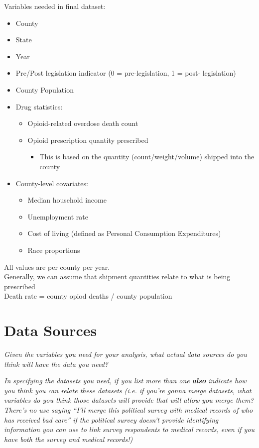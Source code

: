 \documentclass[12pt]{article}
\begin{document}
Variables needed in final dataset:
\begin{itemize}
    \item County
    \item State
    \item Year
    \item Pre/Post legislation indicator (0 = pre-legislation, 1 = post-
    legislation)
    \item County Population
    \item Drug statistics:
    \begin{itemize}
        \item Opioid-related overdose death count
        \item Opioid prescription quantity prescribed
        \begin{itemize}
            \item This is based on the quantity (count/weight/volume) shipped 
            into the county
        \end{itemize}
    \end{itemize}
    \item County-level covariates:
    \begin{itemize}
        \item Median household income
        \item Unemployment rate
        \item Cost of living (defined as Personal Consumption Expenditures)
        \item Race proportions
        \end{itemize}
\end{itemize}

All values are per county per year.\\
Generally, we can assume that shipment quantities relate to what is being 
prescribed\\
Death rate = county opiod deaths / county population


\pagebreak
\section{Data Sources}

\emph{Given the variables you need for your analysis, what actual data sources 
do you think will have the data you need?}

\emph{In specifying the datasets you need, if you list more than one 
\textbf{also} indicate how you think you can relate these datasets (i.e. if 
you're gonna merge datasets, what variables do you think those datasets will 
provide that will allow you merge them? There's no use saying ``I'll merge this 
political survey with medical records of who has received bad care'' if the 
political survey doesn't provide identifying information you can use to link 
survey respondents to medical records, even if you have both the survey and 
medical records!)}
\end{document}
